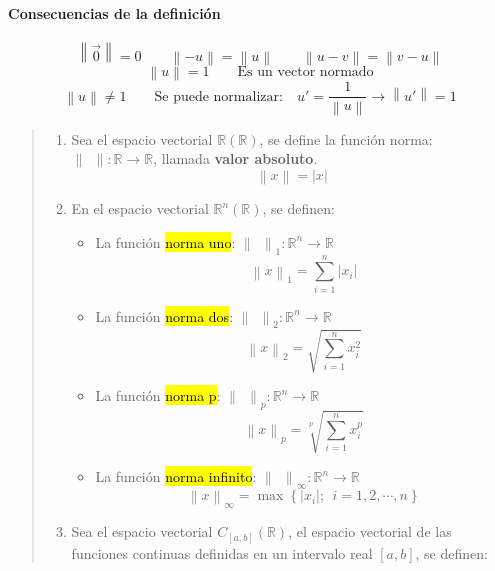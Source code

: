 \paragraph{Consecuencias de la definición}

\[
  \left\lVert \vec{0}\right\rVert = 0 \qquad \left\lVert -u\right\rVert = \left\lVert u\right\rVert \qquad \left\lVert u - v\right\rVert = \left\lVert v - u\right\rVert
\]
\[
\left\lVert u\right\rVert = 1 \qquad \text{Es un vector normado}
\]
\[
\left\lVert u\right\rVert \neq 1 \qquad \text{Se puede normalizar:} \quad u' = \frac{1}{\left\lVert u\right\rVert} \rightarrow \left\lVert u'\right\rVert = 1
\]

\begin{quote}
  \begin{enumerate}
    \item Sea el espacio vectorial \(\mathbb{R}(\mathbb{R})\), se define la función norma: \(\left\lVert ~~ \right\rVert: \mathbb{R} \rightarrow \mathbb{R}\), llamada \textbf{valor absoluto}. \[
      \left\lVert x\right\rVert = \left|x\right|
    \]
    \item En el espacio vectorial \(\mathbb{R}^n(\mathbb{R})\), se definen:
    \begin{itemize}
      \item La función \hl{norma uno}: \(\left\lVert ~~\right\rVert _1 : \mathbb{R}^n \rightarrow \mathbb{R}\)\[
        \left\lVert x\right\rVert _1 = \sum_{i=1}^{n} \left|x_i\right|
      \]
      \item La función \hl{norma dos}: \(\left\lVert ~~\right\rVert _2 : \mathbb{R}^n \rightarrow \mathbb{R}\) \[
        \left\lVert x\right\rVert _2 = \sqrt{\sum_{i=1}^{n}x_i^2}
      \]
      \item La función \hl{norma p}: \(\left\lVert ~~\right\rVert _p : \mathbb{R}^n \rightarrow \mathbb{R}\) \[
        \left\lVert x\right\rVert _p = \sqrt[p]{\sum_{i=1}^{n}x_i^p}
      \]
      \item La función \hl{norma infinito}: \(\left\lVert ~~\right\rVert _\infty : \mathbb{R}^n \rightarrow \mathbb{R}\) \[
        \left\lVert x\right\rVert _\infty = \max \left\{\left|x_i\right|; ~~ i = 1,2,\cdots,n\right\}
      \]
    \end{itemize}
    \item Sea el espacio vectorial \(C_{\left[a,b\right]} (\mathbb{R})\), el espacio vectorial de las funciones continuas definidas en un intervalo real \([a,b]\), se definen:
    \begin{itemize}

\end{itemize}
\end{enumerate}
\end{quote}
